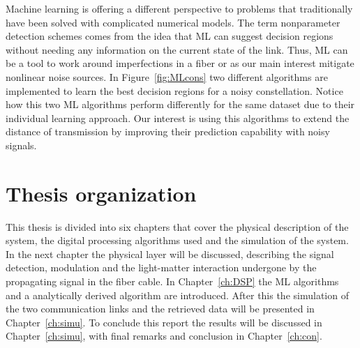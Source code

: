 Machine learning is offering a different perspective to problems that traditionally have been solved with complicated numerical models. The term nonparameter detection schemes comes from the idea that ML can suggest decision regions without needing any information on the current state of the link. Thus, ML can be a tool to work around imperfections in a fiber or as our main interest mitigate nonlinear noise sources. In Figure~\ref{fig:MLcons} two different algorithms are implemented to learn the best decision regions for a noisy constellation. Notice how this two ML algorithms perform differently for the same dataset due to their individual learning approach. Our interest is using this algorithms to extend the distance of transmission by improving their prediction capability with noisy signals.   





 



\section{Thesis organization}

This thesis is divided into six chapters that cover the physical description of the system, the digital processing algorithms used and the simulation of the system. In the next chapter the physical layer will be discussed, describing the signal detection, modulation  and the light-matter interaction undergone by the propagating signal in the fiber cable. In Chapter~\ref{ch:DSP} the ML algorithms and a analytically derived algorithm are introduced. After this the simulation of the two communication links and the retrieved data will be presented in Chapter~\ref{ch:simu}. To conclude this report the results will be discussed in Chapter~\ref{ch:simu}, with final remarks and conclusion in Chapter~\ref{ch:con}.  


